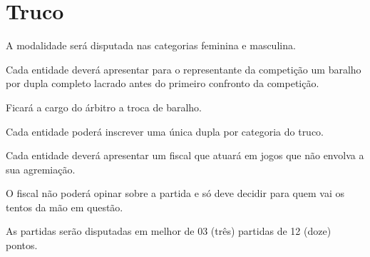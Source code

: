 {\let\clearpage\relax \chapter{Truco}}

\begin{article}
	A modalidade será disputada nas categorias feminina e masculina.
\end{article}

\begin{article}
	Cada entidade deverá apresentar para o representante da competição um baralho por dupla completo lacrado antes do primeiro confronto da competição.

	\begin{xparagraph}
		Ficará a cargo do árbitro a troca de baralho.
	\end{xparagraph}
\end{article}

\begin{article}
	Cada entidade poderá inscrever uma única dupla por categoria do truco.
\end{article}

\begin{article}
	Cada entidade deverá apresentar um fiscal que atuará em jogos que não envolva a sua agremiação.

	\begin{xparagraph}
		O fiscal não poderá opinar sobre a partida e só deve decidir para quem vai os tentos da mão em questão.
	\end{xparagraph}
\end{article}

\begin{article}
	As partidas serão disputadas em melhor de 03 (três) partidas de 12 (doze) pontos.
\end{article}

